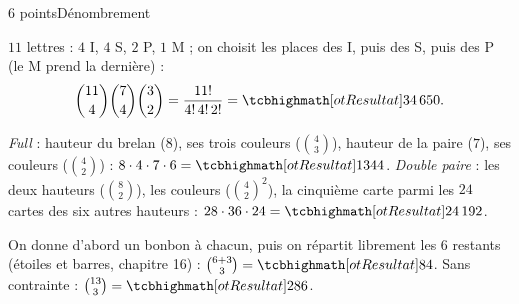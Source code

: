 \begin{corrigeEval}{6 points}{Dénombrement}
\begin{questions}
  \item $11$ lettres : $4$ I, $4$ S, $2$ P, $1$ M ; on choisit les places
    des I, puis des S, puis des P (le M prend la dernière) :
    \[\binom{11}{4}\binom{7}{4}\binom{3}{2}=\frac{11!}{4!\,4!\,2!}=\res{34\,650}.\]
  \item \emph{Full} : hauteur du brelan ($8$), ses trois couleurs
    ($\binom43$), hauteur de la paire ($7$), ses couleurs ($\binom42$) :
    $8\cdot4\cdot7\cdot6=\res{1344}$. \emph{Double paire} : les deux
    hauteurs ($\binom82$), les couleurs ($\binom42^{2}$), la cinquième
    carte parmi les $24$ cartes des six autres hauteurs : $28\cdot36\cdot24=\res{24\,192}$.
  \item On donne d'abord un bonbon à chacun, puis on répartit librement
    les $6$ restants (étoiles et barres, chapitre 16) :
    $\binom{6+3}{3}=\res{84}$. Sans contrainte : $\binom{13}{3}=\res{286}$.
\end{questions}
\end{corrigeEval}
